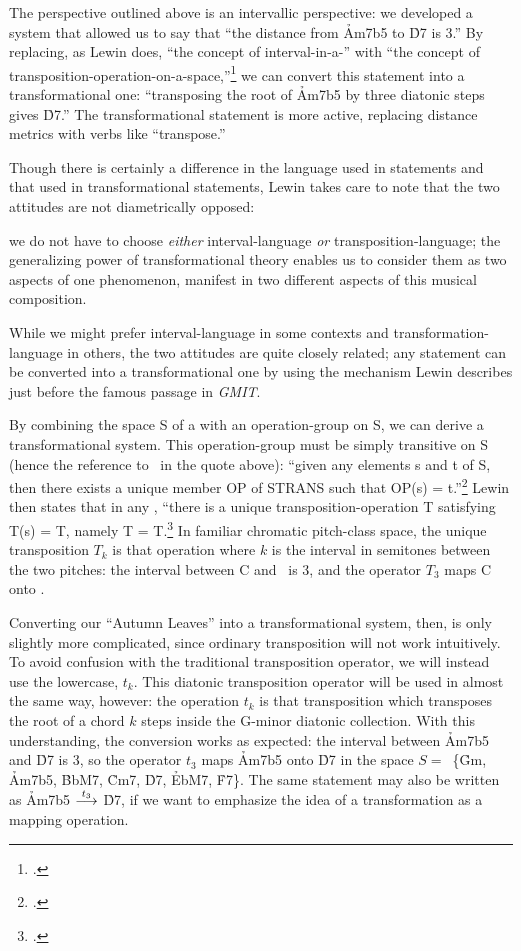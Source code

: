 \documentclass[diss]{subfiles}
\begin{document}
The \gis{} perspective outlined above is an intervallic perspective: we developed
a system that allowed us to say that “the distance from \h{Am7b5} to \h{D7} is
3.” By replacing, as Lewin does, “the concept of interval-in-a-\gis{}” with “the
concept of transposition-operation-on-a-space,”\footcite[157]{lewin:gmit} we
can convert this \gis{} statement into a transformational one: “transposing the
root of \h{Am7b5} by three diatonic steps gives \h{D7}.” The transformational
statement is more active, replacing distance metrics with verbs like
“transpose.”

Though there is certainly a difference in the language used in \gis{} statements
and that used in transformational statements, Lewin takes care to note that
the two attitudes are not diametrically opposed:
\begin{quoting}
  \singlespacing
  we do not have to choose \emph{either} interval-language \emph{or}
  transposition-language; the generalizing power of transformational theory
  enables us to consider them as two aspects of one phenomenon, manifest in
  two different aspects of this musical composition.
\end{quoting}
While we might prefer interval-language in some contexts and
transformation-language in others, the two attitudes are quite closely
related; any \gis{} statement can be converted into a transformational one by
using the mechanism Lewin describes just before the famous passage in
\emph{GMIT}.

By combining the space S of a \gis{} with an operation-group on S, we can derive
a transformational system. This operation-group must be simply transitive on S
(hence the reference to \strans\ in the quote above): “given any elements s and
t of S, then there exists a unique member OP of STRANS such that OP(s) =
t.”\footcite[157]{lewin:gmit} Lewin then states that in any \gis{}, “there is a
unique transposition-operation T satisfying T(s) = T, namely T =
T.\footcite[157]{lewin:gmit} In familiar chromatic pitch-class
space, the unique transposition $T_k$ is that operation where $k$ is the
interval in semitones between the two pitches: the interval between C and
\Eflat\ is 3, and the operator $T_3$ maps C onto \Eflat.

Converting our “Autumn Leaves” \gis{} into a transformational system, then, is
only slightly more complicated, since ordinary transposition will not work
intuitively. To avoid confusion with the traditional transposition operator,
we will instead use the lowercase, $t_k$. This diatonic transposition
operator will be used in almost the same way, however: the operation $t_k$ is
that transposition which transposes the root of a chord $k$ steps inside the
G-minor diatonic collection. With this understanding, the conversion works as
expected: the interval between \h{Am7b5} and \h{D7} is 3, so the operator
$t_3$ maps \h{Am7b5} onto \h{D7} in the space \mbox{$S =$ \{\h{Gm},}
\h{Am7b5}, \h{BbM7}, \h{Cm7}, \h{D7}, \h{EbM7}, \h{F7}\}. The same
statement may also be written as \h{Am7b5} $\overset{t_3}{\longrightarrow}$ \h{D7}, if we
want to emphasize the idea of a transformation as a mapping operation.
\end{document}
